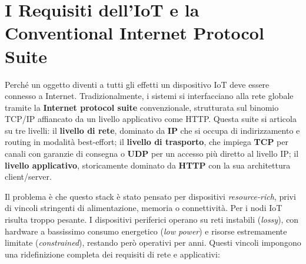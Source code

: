 \documentclass[
  italian,
  openany]{book}
\begin{document}
\section{I Requisiti dell'IoT e la Conventional Internet Protocol
Suite}\label{i-requisiti-delliot-e-la-conventional-internet-protocol-suite}

Perché un oggetto diventi a tutti gli effetti un dispositivo IoT deve
essere connesso a Internet. Tradizionalmente, i sistemi si interfacciano
alla rete globale tramite la \textbf{Internet protocol suite}
convenzionale, strutturata sul binomio TCP/IP affiancato da un livello
applicativo come HTTP. Questa suite si articola su tre livelli: il
\textbf{livello di rete}, dominato da \textbf{IP} che si occupa di
indirizzamento e routing in modalità best-effort; il \textbf{livello di
trasporto}, che impiega \textbf{TCP} per canali con garanzie di consegna
o \textbf{UDP} per un accesso più diretto al livello IP; il
\textbf{livello applicativo}, storicamente dominato da \textbf{HTTP} con
la sua architettura client/server.

Il problema è che questo stack è stato pensato per dispositivi
\emph{resource-rich}, privi di vincoli stringenti di alimentazione,
memoria o connettività. Per i nodi IoT risulta troppo pesante. I
dispositivi periferici operano su reti instabili (\emph{lossy}), con
hardware a bassissimo consumo energetico (\emph{low power}) e risorse
estremamente limitate (\emph{constrained}), restando però operativi per
anni. Questi vincoli impongono una ridefinizione completa dei requisiti
di rete e applicativi:
\end{document}
